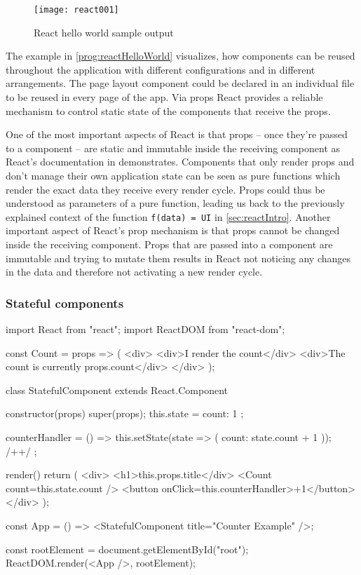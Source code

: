 \begin{figure}
  \centering
  \texttt{[image: react001]}
  \caption{React hello world sample output}
  \label{fig:reactHelloWorld}
\end{figure}

The example in \ref{prog:reactHelloWorld} visualizes, how components can be reused throughout the application with different configurations and in different arrangements. The page layout component could be declared in an individual file to be reused in every page of the app. Via props React provides a reliable mechanism to control static state of the components that receive the props.

One of the most important aspects of React is that props -- once they're passed to a component -- are static and immutable inside the receiving component as React's documentation in \cite[/docs/components-and-props.html\#props-are-read-only]{React} demonstrates. Components that only render props and don't manage their own application state can be seen as pure functions which render the exact data they receive every render cycle. Props could thus be understood as parameters of a pure function, leading us back to the previously explained context of the function \texttt{f(data) = UI} in \ref{sec:reactIntro}. Another important aspect of React's prop mechanism is that props cannot be changed inside the receiving component. Props that are passed into a component are immutable and trying to mutate them results in React not noticing any changes in the data and therefore not activating a new render cycle.

\subsubsection{Stateful components}

\begin{program}
\caption{Simple example of a React component and its usage} 
\label{prog:reactStateful}
\begin{JsCode}
import React from "react";
import ReactDOM from "react-dom";

const Count = props => (
  <div>
    <div>I render the count</div>
    <div>The count is currently {props.count}</div>
  </div>
);

class StatefulComponent extends React.Component {
  constructor(props) {
    super(props);
    this.state = {
      count: 1
    };
  }

  counterHandler = () => {
    this.setState(state => ({ count: state.count + 1 })); /+\label{line:setState}+/
  };

  render() {
    return (
      <div>
        <h1>{this.props.title}</div>
        <Count count={this.state.count} />
        <button onClick={this.counterHandler}>+1</button>
      </div>
    );
  }
}

const App = () => <StatefulComponent title={"Counter Example"} />;

const rootElement = document.getElementById("root");
ReactDOM.render(<App />, rootElement);
\end{JsCode}
\end{program}

